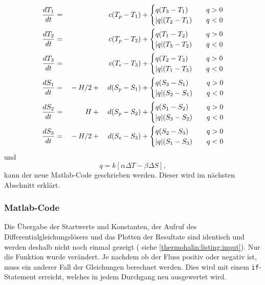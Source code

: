 \begin{alignat}{3}
\frac{dT_1}{dt} &=&              &                     &c(T_p-T_1)&+\begin{cases} q(T_3-T_1) & \quad q>0 \\ |q|(T_2-T_1) & \quad q<0 \end{cases}
\notag
\\
\frac{dT_2}{dt} &=&              &                     &c(T_p-T_2)&+\begin{cases} q(T_1-T_2) & \quad q>0 \\ |q|(T_3-T_2) & \quad q<0 \end{cases}
\\
\frac{dT_3}{dt} &=&              &                     &c(T_e-T_3)&+\begin{cases} q(T_2-T_3) & \quad q>0 \\ |q|(T_1-T_3) & \quad q<0 \end{cases}
\notag
\\
\frac{dS_1}{dt} &=&\mathstrut -H/2         &\mathstrut+\mathstrut&d(S_p-S_1)&+\begin{cases} q(S_3-S_1) & \quad q>0 \\ |q|(S_2-S_1) & \quad q<0 \end{cases}
\notag
\\
\frac{dS_2}{dt} &=& \phantom{-}H &\mathstrut+\mathstrut&d(S_p-S_2)&+\begin{cases} q(S_1-S_2) & \quad q>0 \\ |q|(S_3-S_2) & \quad q<0 \end{cases}	
\\
\frac{dS_3}{dt} &=&\mathstrut -H/2         &\mathstrut+\mathstrut&d(S_e-S_3)&+\begin{cases} q(S_2-S_3) & \quad q>0 \\ |q|(S_1-S_3) & \quad q<0 \end{cases}
\notag
\end{alignat}
und
\begin{equation}
q = k[\alpha\Delta T-\beta\Delta S],
\end{equation}
kann der neue Matlab-Code geschrieben werden. Dieser wird im nächsten Abschnitt erklärt.


\subsubsection{Matlab-Code}

Die Übergabe der Startwerte und Konstanten, der Aufruf des Differentialgleichungslösers und das Plotten der Resultate sind identisch und werden deshalb nicht noch einmal gezeigt ( siehe  \ref{thermohalin:listing:input}). Nur die Funktion wurde verändert. Je nachdem ob der Fluss positiv oder negativ ist, muss ein anderer Fall der Gleichungen berechnet werden. Dies wird mit einem \texttt{if}-Statement erreicht, welches in jedem Durchgang neu ausgewertet wird. 

